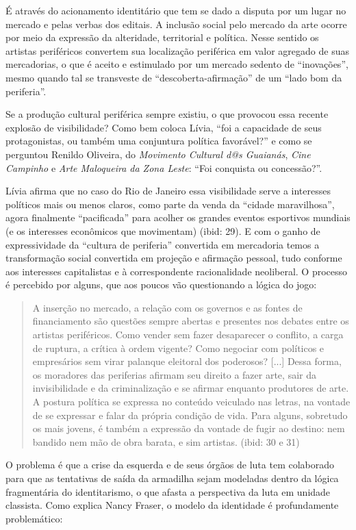 É através do acionamento identitário que tem se dado a disputa por um
lugar no mercado e pelas verbas dos editais. A inclusão social pelo
mercado da arte ocorre por meio da expressão da alteridade, territorial
e política. Nesse sentido os artistas periféricos convertem sua
localização periférica em valor agregado de suas mercadorias, o que é
aceito e estimulado por um mercado sedento de ``inovações'', mesmo
quando tal se transveste de ``descoberta-afirmação'' de um ``lado bom da
periferia''.

Se a produção cultural periférica sempre existiu, o que provocou essa
recente explosão de visibilidade? Como bem coloca Lívia, ``foi a
capacidade de seus protagonistas, ou também uma conjuntura política
favorável?'' e como se perguntou Renildo Oliveira, do \emph{Movimento
Cultural d@s Guaianás}, \emph{Cine Campinho} e \emph{Arte Maloqueira da
Zona Leste}: ``Foi conquista ou concessão?''.

Lívia afirma que no caso do Rio de Janeiro essa visibilidade serve a
interesses políticos mais ou menos claros, como parte da venda da
``cidade maravilhosa'', agora finalmente ``pacificada'' para acolher os
grandes eventos esportivos mundiais (e os interesses econômicos que
movimentam) (ibid: 29). E com o ganho de expressividade da ``cultura de
periferia'' convertida em mercadoria temos a transformação social
convertida em projeção e afirmação pessoal, tudo conforme aos interesses
capitalistas e à correspondente racionalidade neoliberal. O processo é
percebido por alguns, que aos poucos vão questionando a lógica do jogo:

\begin{quote}
A inserção no mercado, a relação com os governos e as fontes de
financiamento são questões sempre abertas e presentes nos debates entre
os artistas periféricos. Como vender sem fazer desaparecer o conflito, a
carga de ruptura, a crítica à ordem vigente? Como negociar com políticos
e empresários sem virar palanque eleitoral dos poderosos? {[}...{]}
Dessa forma, os moradores das periferias afirmam seu direito a fazer
arte, sair da invisibilidade e da criminalização e se afirmar enquanto
produtores de arte. A postura política se expressa no conteúdo veiculado
nas letras, na vontade de se expressar e falar da própria condição de
vida. Para alguns, sobretudo os mais jovens, é também a expressão da
vontade de fugir ao destino: nem bandido nem mão de obra barata, e sim
artistas. (ibid: 30 e 31)
\end{quote}

O problema é que a crise da esquerda e de seus órgãos de luta tem
colaborado para que as tentativas de saída da armadilha sejam modeladas
dentro da lógica fragmentária do identitarismo, o que afasta a
perspectiva da luta em unidade classista. Como explica Nancy Fraser, o
modelo da identidade é profundamente problemático:

